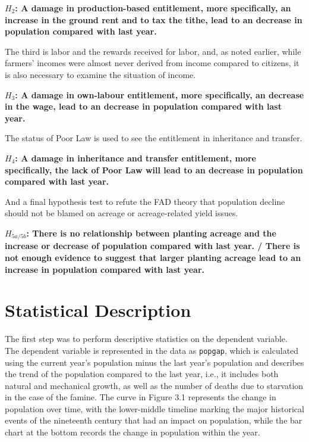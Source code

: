 \textbf{$H_2$: A damage in production-based entitlement, more specifically, an increase in the ground rent and to tax the tithe, lead to an decrease in population compared with last year.}

The third is labor and the rewards received for labor, and, as noted earlier, while farmers' incomes were almost never derived from income compared to citizens, it is also necessary to examine the situation of income.

\textbf{$H_3$: A damage in own-labour entitlement, more specifically, an decrease in the wage, lead to an decrease in population compared with last year.}

The status of Poor Law is used to see the entitlement in inheritance and transfer.

\textbf{$H_4$: A damage in inheritance and transfer entitlement, more specifically, the lack of Poor Law will lead to an decrease in population compared with last year.}

And a final hypothesis test to refute the FAD theory that population decline should not be blamed on acreage or acreage-related yield issues.

\textbf{$H_{5a/5b}$: There is no relationship between planting acreage and the increase or decrease of population compared with last year. / There is not enough evidence to suggest that larger planting acreage lead to an increase in population compared with last year.}

\newpage

\section{Statistical Description}

The first step was to perform descriptive statistics on the dependent variable. The dependent variable is represented in the data as \texttt{popgap}, which is calculated using the current year's population minus the last year's population and describes the trend of the population compared to the last year, i.e., it includes both natural and mechanical growth, as well as the number of deaths due to starvation in the case of the famine. The curve in Figure 3.1 represents the change in population over time, with the lower-middle timeline marking the major historical events of the nineteenth century that had an impact on population, while the bar chart at the bottom records the change in population within the year.

